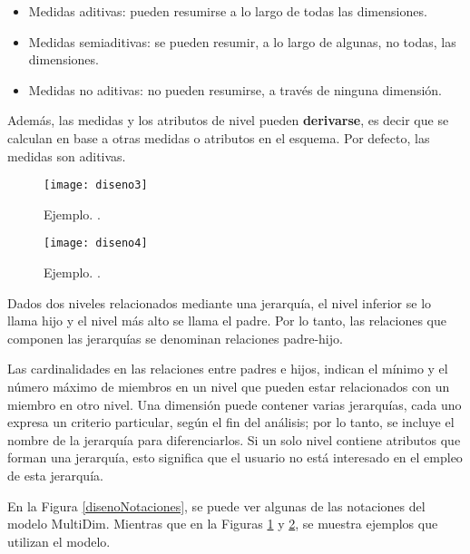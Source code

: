 \documentclass[a4paper,11pt]{article}
\begin{document}
\begin{itemize}
        \begin{itemize}
          \item Medidas aditivas: pueden resumirse a lo largo de todas las dimensiones.
          \item Medidas semiaditivas: se pueden resumir, a lo largo de algunas, no todas, las dimensiones.
          \item Medidas no aditivas: no pueden resumirse, a través de ninguna dimensión.
        \end{itemize}
        Además, las medidas y los atributos de nivel pueden \textbf{derivarse}, es decir que se calculan en base a otras medidas o atributos en el esquema.
        Por defecto, las medidas son aditivas.
      \end{itemize}
      
      \begin{figure}
        \begin{center}
          \texttt{[image: diseno3]}
          \caption{Ejemplo. \cite[p.~592]{VaismanZimanyi14}.}
          \label{disenoEj1}
        \end{center}
      \end{figure}
      
      \begin{figure}
        \begin{center}
          \texttt{[image: diseno4]}
          \caption{Ejemplo. \cite[p.~107]{VaismanZimanyi14}.}
          \label{disenoEj2}
        \end{center}
      \end{figure}
    
      Dados dos niveles relacionados mediante una jerarquía, el nivel inferior se lo llama hijo y el nivel más alto se llama el padre.
      Por lo tanto, las relaciones que componen las jerarquías se denominan relaciones padre-hijo.
      
      Las cardinalidades en las relaciones entre padres e hijos, indican el mínimo y el número máximo de miembros en un nivel que pueden estar relacionados
      con un miembro en otro nivel.
      Una dimensión puede contener varias jerarquías, cada uno expresa un criterio particular, según el fin del análisis; por lo tanto, se incluye el nombre
      de la jerarquía para diferenciarlos. Si un solo nivel contiene atributos que forman una jerarquía, esto significa que el usuario no está interesado
      en el empleo de esta jerarquía.
      
      En la Figura \ref{disenoNotaciones}, se puede ver algunas de las notaciones del modelo MultiDim. Mientras que en la Figuras \ref{disenoEj1} y \ref{disenoEj2},
      se muestra ejemplos que utilizan el modelo.
      
\end{document}
